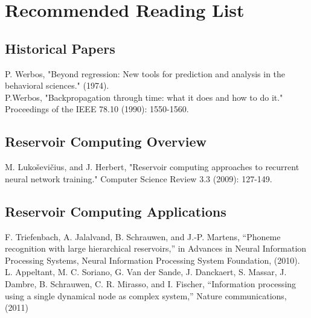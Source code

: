 \documentclass[
10pt, %
a4paper, %
oneside, %
headinclude,footinclude, %
BCOR5mm, %
]{scrartcl}
\begin{document}


\newpage %
\enlargethispage*{\baselineskip}


\section{Recommended Reading List}

\subsection{Historical Papers}
P. Werbos, "Beyond regression: New tools for prediction and analysis in the behavioral sciences." (1974).\\

\noindent
P.Werbos, "Backpropagation through time: what it does and how to do it." Proceedings of the IEEE 78.10 (1990): 1550-1560.

\subsection{Reservoir Computing Overview}
M. Luko{\v{s}}evi{\v{c}}ius, and J. Herbert, "Reservoir computing approaches to recurrent neural network training." Computer Science Review 3.3 (2009): 127-149.

\subsection{Reservoir Computing Applications}
F. Triefenbach, A. Jalalvand, B. Schrauwen, and J.-P. Martens, “Phoneme recognition with large hierarchical reservoirs,” in Advances in Neural Information Processing Systems, Neural Information Processing System Foundation, (2010).\\

\noindent
L. Appeltant, M. C. Soriano, G. Van der Sande, J. Danckaert, S. Massar, J. Dambre,
B. Schrauwen, C. R. Mirasso, and I. Fischer, “Information processing using a single dynamical node as complex system,” Nature communications, (2011)\\
\end{document}
